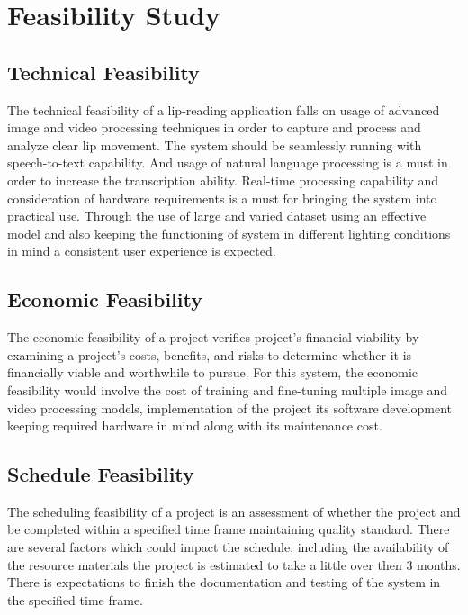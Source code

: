 \chapter{Feasibility Study}

\section{Technical Feasibility}

The technical feasibility of a lip-reading application falls on usage of advanced image and video processing techniques in order to capture and process and analyze clear lip movement. The system should be seamlessly running with speech-to-text capability. And usage of natural language processing is a must in order to increase the transcription ability.  Real-time processing capability and consideration of hardware requirements is a must for bringing the system into practical use. Through the use of large and varied dataset using an effective model and also keeping the functioning of system in different lighting conditions in mind a consistent user experience is expected.

\section{Economic Feasibility}

The economic feasibility of a project verifies project's financial viability by examining a project's costs, benefits, and risks to determine whether it is financially viable and worthwhile to pursue.
For this system, the economic feasibility would involve the cost of training and fine-tuning multiple image and video processing models, implementation of the project its software development keeping required hardware in mind along with its maintenance cost.

\section{Schedule Feasibility}

The scheduling feasibility of a project is an assessment of whether the project and be completed within a specified time frame maintaining quality standard. There are several factors which could impact the schedule, including the availability of the resource materials the project is estimated to take a little over then 3 months. There is expectations to finish the documentation and testing of the system in the specified time frame.